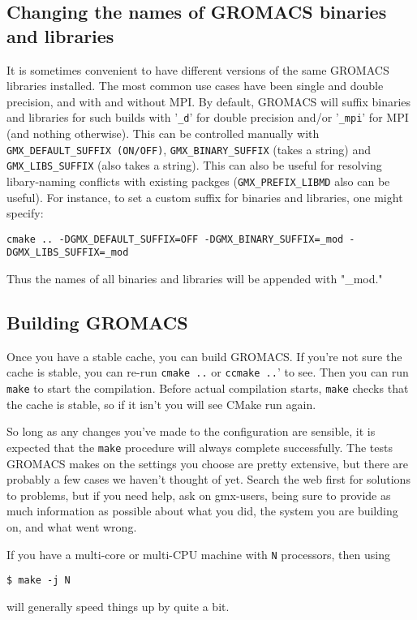 \documentclass{article}[12pt,a4paper,twoside]
\newcommand{\gromacs}{GROMACS}
\newcommand{\mpi}{MPI}
\newcommand{\cmake}{CMake}
\begin{document}
\subsection{Changing the names of GROMACS binaries and libraries}
It is sometimes convenient to have different versions of the same
\gromacs{} libraries installed. The most common use cases have been
single and double precision, and with and without \mpi{}. By default,
\gromacs{} will suffix binaries and libraries for such builds with
'\verb+_d+' for double precision and/or '\verb+_mpi+' for \mpi{} (and
nothing otherwise). This can be controlled manually with
\verb+GMX_DEFAULT_SUFFIX (ON/OFF)+, \verb+GMX_BINARY_SUFFIX+ (takes 
a string) and \verb+GMX_LIBS_SUFFIX+ (also takes a string). 
This can also be useful for resolving libary-naming conflicts with 
existing packges (\verb+GMX_PREFIX_LIBMD+ also can be useful).
For instance, to set a custom suffix for binaries and libraries, 
one might specify:

\begin{verbatim}
cmake .. -DGMX_DEFAULT_SUFFIX=OFF -DGMX_BINARY_SUFFIX=_mod -DGMX_LIBS_SUFFIX=_mod
\end{verbatim}

Thus the names of all binaries and libraries will be appended with
"_mod."

\subsection{Building \gromacs{}}

Once you have a stable cache, you can build \gromacs{}. If you're not
sure the cache is stable, you can re-run \verb+cmake ..+ or
\verb+ccmake ..+' to see. Then you can run \verb+make+ to start the
compilation. Before actual compilation starts, \verb+make+ checks
that the cache is stable, so if it isn't you will see \cmake{} run
again.

So long as any changes you've made to the configuration are sensible,
it is expected that the \verb+make+ procedure will always complete
successfully. The tests \gromacs{} makes on the settings you choose
are pretty extensive, but there are probably a few cases we haven't
thought of yet. Search the web first for solutions to problems, but if
you need help, ask on gmx-users, being sure to provide as much
information as possible about what you did, the system you are
building on, and what went wrong.

If you have a multi-core or multi-CPU machine with \verb+N+
processors, then using
\begin{verbatim}
$ make -j N
\end{verbatim}
will generally speed things up by quite a bit.
\end{document}
